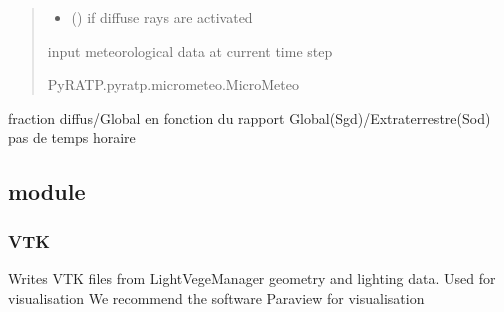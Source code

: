 \documentclass[letterpaper,10pt,english]{sphinxmanual}
\begin{document}
\begin{fulllineitems}
\begin{quote}
\begin{description}
\begin{itemize}
\item {} 
\sphinxAtStartPar
{} () \textendash{} if diffuse rays are activated

\end{itemize}

\sphinxAtStartPar
input meteorological data at current time step

\sphinxAtStartPar
PyRATP.pyratp.micrometeo.MicroMeteo

\end{description}\end{quote}

\end{fulllineitems}


\begin{fulllineitems}
\label{\detokenize{reference:RATPinputs.RdRsH}}
\pysigstartsignatures
{}
\pysigstopsignatures
\sphinxAtStartPar
fraction diffus/Global en fonction du rapport Global(Sgd)/Extraterrestre(Sod)\sphinxhyphen{} pas de temps horaire

\end{fulllineitems}



\subsection{ module}
\label{\detokenize{reference:module-VTK}}\label{\detokenize{reference:vtk-module}}

\subsubsection{VTK}
\label{\detokenize{reference:vtk}}
\sphinxAtStartPar
Writes VTK files from LightVegeManager geometry and lighting data. Used for visualisation
We recommend the software Paraview for visualisation
\end{document}
